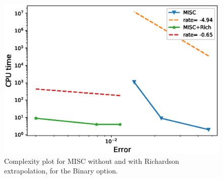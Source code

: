 \documentclass[11pt]{article}
\begin{document}
\begin{figure}[h!]
\centering
\includegraphics[width=0.7\linewidth]{./figures/Binary_Complexity_rates/error_vs_time_comparison}

\caption{Complexity plot for MISC without and with Richardson extrapolation, for the Binary option.}
\label{fig:Complexity plot for MC and MISC , Binary, comparison}
\end{figure}

\FloatBarrier



%
%
\end{document}
